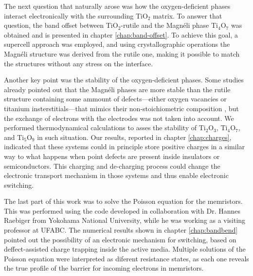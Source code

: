 The next question that naturally arose was how the oxygen-deficient phases interact electronically with the surrounding TiO$_2$ matrix. To answer that question, the band offset between TiO$_2$-rutile and the Magnéli phase Ti$_4$O$_7$ was obtained and is presented in chapter \ref{chap:band-offset}. To achieve this goal, a supercell approach was employed, and using crystallographic operations the Magnéli structure was derived from the rutile one, making it possible to match the structures without any stress on the interface.

Another key point was the stability of the oxygen-deficient phases. Some studies already pointed out that the Magnéli phases are more stable than the rutile structure containing some ammount of defects---either oxygen vacancies or titanium insterstitials---that mimics their non-stoichiometric composition \cite{Liborio2008}, but the exchange of electrons with the electrodes was not taken into account. We performed thermodynamical calculations to asses the stability of Ti$_2$O$_3$, Ti$_4$O$_7$, and Ti$_5$O$_9$ in such situation. Our results, reported in chapter \ref{chap:charges}, indicated that these systems could in principle store positive charges in a similar way to what happens when point defects are present inside insulators or semiconductors. This charging and de-charging process could change the electronic transport mechanism in those systems and thus enable electronic switching.

The last part of this work was to solve the Poisson equation for the memristors. This was performed using the code developed in collaboration with Dr. Hannes Raebiger from Yokohama National University, while he was working as a visiting professor at UFABC. The numerical results shown in chapter \ref{chap:bandbend} pointed out the possibility of an electronic mechanism for switching, based on deffect-assisted charge trapping inside the active media. Multiple solutions of the Poisson equation were interpreted as diferent resistance states, as each one reveals the true profile of the barrier for incoming electrons in memristors. 

